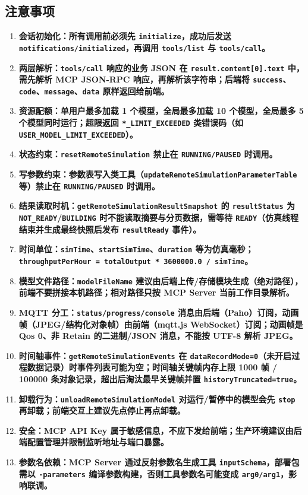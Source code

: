 \subsection{注意事项}
\begin{enumerate}[label=\arabic*)]
	\item \bf{会话初始化}：所有调用前必须先 \texttt{initialize}，成功后发送 \texttt{notifications/initialized}，再调用 \texttt{tools/list} 与 \texttt{tools/call}。
	\item \bf{两层解析}：\texttt{tools/call} 响应的业务 JSON 在 \texttt{result.content[0].text} 中，需先解析 MCP JSON-RPC 响应，再解析该字符串；后端将 \texttt{success}、\texttt{code}、\texttt{message}、\texttt{data} 原样返回给前端。
	\item \bf{资源配额}：单用户最多加载 1 个模型，全局最多加载 10 个模型，全局最多 5 个模型同时运行；超限返回 \texttt{*\_LIMIT\_EXCEEDED} 类错误码（如 \texttt{USER\_MODEL\_LIMIT\_EXCEEDED}）。
	\item \bf{状态约束}：\texttt{resetRemoteSimulation} 禁止在 \texttt{RUNNING/PAUSED} 时调用。
	\item \bf{写参数约束}：参数表写入类工具（\texttt{updateRemoteSimulationParameterTable} 等）禁止在 \texttt{RUNNING/PAUSED} 时调用。
	\item \bf{结果读取时机}：\texttt{getRemoteSimulationResultSnapshot} 的 \texttt{resultStatus} 为 \texttt{NOT\_READY}/\texttt{BUILDING} 时不能读取摘要与分页数据，需等待 \texttt{READY}（仿真线程结束并生成最终快照后发布 \texttt{resultReady} 事件）。
	\item \bf{时间单位}：\texttt{simTime}、\texttt{startSimTime}、\texttt{duration} 等为仿真毫秒；\texttt{throughputPerHour = totalOutput * 3600000.0 / simTime}。
	\item \bf{模型文件路径}：\texttt{modelFileName} 建议由后端上传/存储模块生成（绝对路径），前端不要拼接本机路径；相对路径只按 MCP Server 当前工作目录解析。
	\item \bf{MQTT 分工}：\texttt{status/progress/console} 消息由后端（Paho）订阅，动画帧（JPEG/结构化对象帧）由前端（mqtt.js WebSocket）订阅；动画帧是 Qos 0、非 Retain 的二进制/JSON 消息，不能按 UTF-8 解析 JPEG。
	\item \bf{时间轴事件}：\texttt{getRemoteSimulationEvents} 在 \texttt{dataRecordMode=0}（未开启过程数据记录）时事件列表可能为空；时间轴关键帧内存上限 1000 帧 / 100000 条对象记录，超出后淘汰最早关键帧并置 \texttt{historyTruncated=true}。
	\item \bf{卸载行为}：\texttt{unloadRemoteSimulationModel} 对运行/暂停中的模型会先 \texttt{stop} 再卸载；前端交互上建议先点停止再点卸载。
	\item \bf{安全}：MCP API Key 属于敏感信息，不应下发给前端；生产环境建议由后端配置管理并限制监听地址与端口暴露。
	\item \bf{参数名依赖}：MCP Server 通过反射参数名生成工具 \texttt{inputSchema}，部署包需以 \texttt{-parameters} 编译参数构建，否则工具参数名可能变成 \texttt{arg0/arg1}，影响联调。
\end{enumerate}

